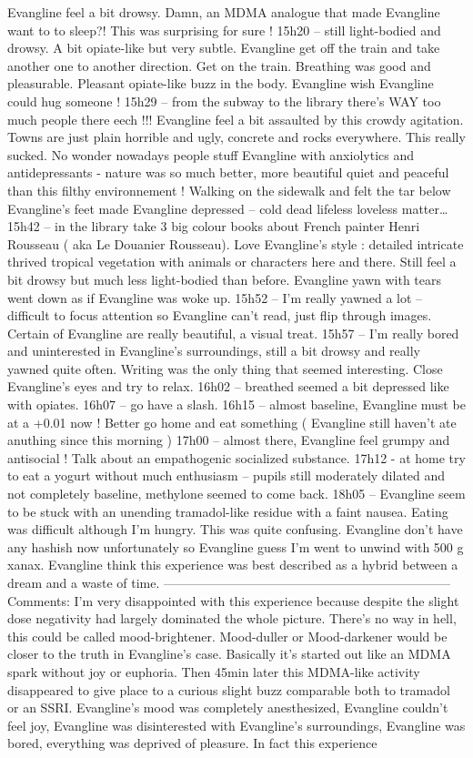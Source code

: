 \documentclass[12pt]{book}
\begin{document}
Evangline feel a bit drowsy. Damn, an MDMA analogue that made Evangline want to to sleep?! This was surprising for sure ! 15h20 -- still light-bodied and drowsy. A bit opiate-like but very subtle. Evangline get off the train and take another one to another direction. Get on the train. Breathing was good and pleasurable. Pleasant opiate-like buzz in the body. Evangline wish Evangline could hug someone ! 15h29 -- from the subway to the library there's WAY too much people there eech !!! Evangline feel a bit assaulted by this crowdy agitation. Towns are just plain horrible and ugly, concrete and rocks everywhere. This really sucked. No wonder nowadays people stuff Evangline with anxiolytics and antidepressants - nature was so much better, more beautiful quiet and peaceful than this filthy environnement ! Walking on the sidewalk and felt the tar below Evangline's feet made Evangline depressed -- cold dead lifeless loveless matter\ldots 15h42 -- in the library take 3 big colour books about French painter Henri Rousseau ( aka Le Douanier Rousseau). Love Evangline's style : detailed intricate thrived tropical vegetation with animals or characters here and there. Still feel a bit drowsy but much less light-bodied than before. Evangline yawn with tears went down as if Evangline was woke up. 15h52 -- I'm really yawned a lot -- difficult to focus attention so Evangline can't read, just flip through images. Certain of Evangline are really beautiful, a visual treat. 15h57 -- I'm really bored and uninterested in Evangline's surroundings, still a bit drowsy and really yawned quite often. Writing was the only thing that seemed interesting. Close Evangline's eyes and try to relax. 16h02 -- breathed seemed a bit depressed like with opiates. 16h07 -- go have a slash. 16h15 -- almost baseline, Evangline must be at a +0.01 now ! Better go home and eat something (  Evangline still haven't ate anuthing since this morning ) 17h00 -- almost there, Evangline feel grumpy and antisocial ! Talk about an empathogenic socialized substance. 17h12 - at home try to eat a yogurt without much enthusiasm -- pupils still moderately dilated and not completely baseline, methylone seemed to come back. 18h05 -- Evangline seem to be stuck with an unending tramadol-like residue with a faint nausea. Eating was difficult although I'm hungry. This was quite confusing. Evangline don't have any hashish now unfortunately so Evangline guess I'm went to unwind with 500 g xanax. Evangline think this experience was best described as a hybrid between a dream and a waste of time. -------------------------------------------------------------------- Comments: I'm very disappointed with this experience because despite the slight dose negativity had largely dominated the whole picture. There's no way in hell, this could be called mood-brightener. Mood-duller or Mood-darkener would be closer to the truth in Evangline's case. Basically it's started out like an MDMA spark without joy or euphoria. Then 45min later this MDMA-like activity disappeared to give place to a curious slight buzz comparable both to tramadol or an SSRI. Evangline's mood was completely anesthesized, Evangline couldn't feel joy, Evangline was disinterested with Evangline's surroundings, Evangline was bored, everything was deprived of pleasure. In fact this experience 
\end{document}
